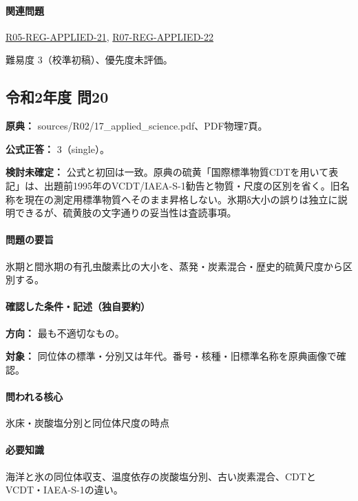 \paragraph{関連問題} \hyperref[q:r05-reg-applied-21]{R05-REG-APPLIED-21}, \hyperref[q:r07-reg-applied-22]{R07-REG-APPLIED-22}

\par 難易度 3（校準初稿）、優先度未評価。

\subsection{令和2年度 問20}
\label{q:r02-reg-applied-20}

\noindent\textbf{原典：} sources/R02/17\_applied\_science.pdf、PDF物理7頁。

\textbf{公式正答：} 3（single）。

\par\textbf{検討未確定：} 公式と初回は一致。原典の硫黄「国際標準物質CDTを用いて表記」は、出題前1995年のVCDT/IAEA-S-1勧告と物質・尺度の区別を省く。旧名称を現在の測定用標準物質へそのまま昇格しない。氷期δ大小の誤りは独立に説明できるが、硫黄肢の文字通りの妥当性は査読事項。

\paragraph{問題の要旨} 氷期と間氷期の有孔虫酸素比の大小を、蒸発・炭素混合・歴史的硫黄尺度から区別する。

\paragraph{確認した条件・記述（独自要約）}\mbox{}\par

\noindent\textbf{方向：} 最も不適切なもの。\par

\noindent\textbf{対象：} 同位体の標準・分別又は年代。番号・核種・旧標準名称を原典画像で確認。\par

\paragraph{問われる核心} 氷床・炭酸塩分別と同位体尺度の時点

\paragraph{必要知識} 海洋と氷の同位体収支、温度依存の炭酸塩分別、古い炭素混合、CDTとVCDT・IAEA-S-1の違い。

